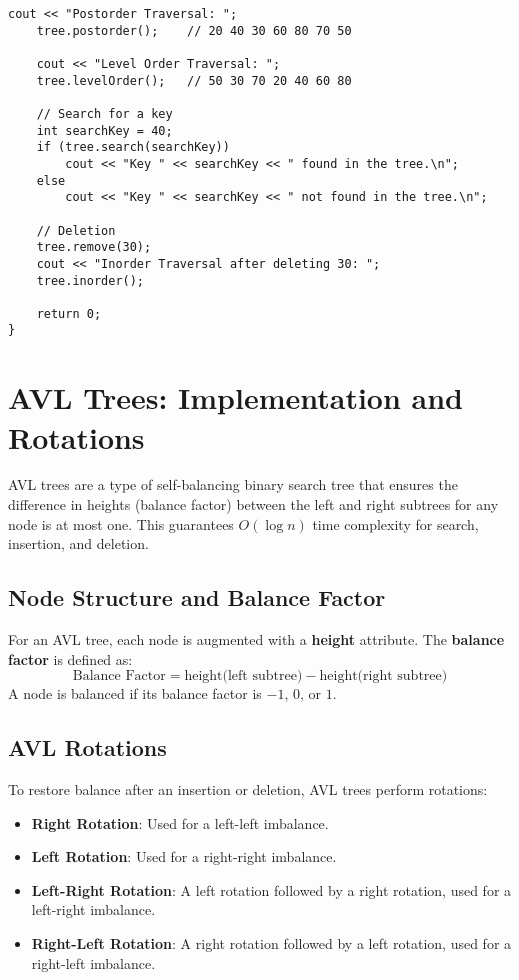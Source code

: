\begin{lstlisting}[caption={C++ implementation of a Binary Search Tree}]
    cout << "Postorder Traversal: ";
    tree.postorder();    // 20 40 30 60 80 70 50
    
    cout << "Level Order Traversal: ";
    tree.levelOrder();   // 50 30 70 20 40 60 80
    
    // Search for a key
    int searchKey = 40;
    if (tree.search(searchKey))
        cout << "Key " << searchKey << " found in the tree.\n";
    else
        cout << "Key " << searchKey << " not found in the tree.\n";
    
    // Deletion
    tree.remove(30);
    cout << "Inorder Traversal after deleting 30: ";
    tree.inorder();
    
    return 0;
}
\end{lstlisting}

\section{AVL Trees: Implementation and Rotations}
AVL trees are a type of self-balancing binary search tree that ensures the difference in heights (balance factor) between the left and right subtrees for any node is at most one. This guarantees \( O(\log n) \) time complexity for search, insertion, and deletion.

\subsection{Node Structure and Balance Factor}
For an AVL tree, each node is augmented with a \textbf{height} attribute. The \textbf{balance factor} is defined as:
\[
\text{Balance Factor} = \text{height(left subtree)} - \text{height(right subtree)}
\]
A node is balanced if its balance factor is \(-1\), \(0\), or \(1\).

\subsection{AVL Rotations}
To restore balance after an insertion or deletion, AVL trees perform rotations:
\begin{itemize}
    \item \textbf{Right Rotation}: Used for a left-left imbalance.
    \item \textbf{Left Rotation}: Used for a right-right imbalance.
    \item \textbf{Left-Right Rotation}: A left rotation followed by a right rotation, used for a left-right imbalance.
    \item \textbf{Right-Left Rotation}: A right rotation followed by a left rotation, used for a right-left imbalance.
\end{itemize}


